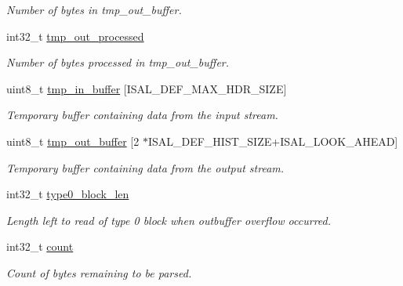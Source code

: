 \begin{DoxyCompactItemize}
\begin{DoxyCompactList}\small\item\em Number of bytes in tmp\-\_\-out\-\_\-buffer. \end{DoxyCompactList}\item 
\hypertarget{structinflate__state_aa4c82daf12d611bca6cb28905a4c5168}{int32\-\_\-t \hyperlink{structinflate__state_aa4c82daf12d611bca6cb28905a4c5168}{tmp\-\_\-out\-\_\-processed}}\label{structinflate__state_aa4c82daf12d611bca6cb28905a4c5168}

\begin{DoxyCompactList}\small\item\em Number of bytes processed in tmp\-\_\-out\-\_\-buffer. \end{DoxyCompactList}\item 
\hypertarget{structinflate__state_aca852f3fbb23de387aa789f572303cf8}{uint8\-\_\-t \hyperlink{structinflate__state_aca852f3fbb23de387aa789f572303cf8}{tmp\-\_\-in\-\_\-buffer} \mbox{[}I\-S\-A\-L\-\_\-\-D\-E\-F\-\_\-\-M\-A\-X\-\_\-\-H\-D\-R\-\_\-\-S\-I\-Z\-E\mbox{]}}\label{structinflate__state_aca852f3fbb23de387aa789f572303cf8}

\begin{DoxyCompactList}\small\item\em Temporary buffer containing data from the input stream. \end{DoxyCompactList}\item 
\hypertarget{structinflate__state_abf70896b8d99c6fbb91c5bb2ff1c2337}{uint8\-\_\-t \hyperlink{structinflate__state_abf70896b8d99c6fbb91c5bb2ff1c2337}{tmp\-\_\-out\-\_\-buffer} \mbox{[}2 $\ast$I\-S\-A\-L\-\_\-\-D\-E\-F\-\_\-\-H\-I\-S\-T\-\_\-\-S\-I\-Z\-E+I\-S\-A\-L\-\_\-\-L\-O\-O\-K\-\_\-\-A\-H\-E\-A\-D\mbox{]}}\label{structinflate__state_abf70896b8d99c6fbb91c5bb2ff1c2337}

\begin{DoxyCompactList}\small\item\em Temporary buffer containing data from the output stream. \end{DoxyCompactList}\item 
\hypertarget{structinflate__state_ade86a18378d63c8d5d55308a2a8b2baf}{int32\-\_\-t \hyperlink{structinflate__state_ade86a18378d63c8d5d55308a2a8b2baf}{type0\-\_\-block\-\_\-len}}\label{structinflate__state_ade86a18378d63c8d5d55308a2a8b2baf}

\begin{DoxyCompactList}\small\item\em Length left to read of type 0 block when outbuffer overflow occurred. \end{DoxyCompactList}\item 
\hypertarget{structinflate__state_a587977c569fe163e400b91dcd8a55849}{int32\-\_\-t \hyperlink{structinflate__state_a587977c569fe163e400b91dcd8a55849}{count}}\label{structinflate__state_a587977c569fe163e400b91dcd8a55849}

\begin{DoxyCompactList}\small\item\em Count of bytes remaining to be parsed. \end{DoxyCompactList}\end{DoxyCompactItemize}


